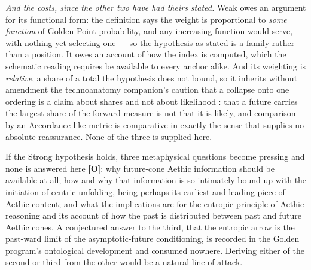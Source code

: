 \begin{remark}
\emph{And the costs, since the other two have had theirs stated.} Weak
owes an argument for its functional form: the definition says the weight
is proportional to \emph{some function} of Golden-Point probability, and
any increasing function would serve, with nothing yet selecting one ---
so the hypothesis as stated is a family rather than a position. It owes
an account of how the index is computed, which the schematic reading
requires be available to every anchor alike. And its weighting is
\emph{relative}, a share of a total the hypothesis does not bound, so it inherits without amendment the technoanatomy companion's caution
that a collapse onto one ordering is a claim about shares and not about
likelihood \cite{GoldenTechnoanatomy}: that a future carries the largest share of the forward
measure is not that it is likely, and comparison by an Accordance-like
metric is comparative in exactly the sense that supplies no absolute
reassurance. None of the three is supplied here.
\end{remark}

\begin{remark}
\label{gc:rem:strongquestions}
If the Strong hypothesis holds, three metaphysical questions become
pressing and none is answered here \textbf{[O]}: why future-cone Aethic
information should be available at all; how and why that information is
so intimately bound up with the initiation of centric unfolding, being
perhaps its earliest and leading piece of Aethic content; and what the implications are for the entropic principle of Aethic reasoning and its account of how the past is distributed between past and future Aethic cones. A conjectured answer to the third, that the entropic arrow is the past-ward limit of the asymptotic-future conditioning, is recorded in the Golden program's ontological development and consumed
nowhere. Deriving either of the second or third from the other would be a
natural line of attack.
\end{remark}

